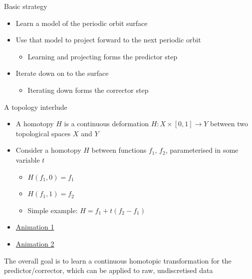 \documentclass[presentation]{beamer}
\begin{document}
\begin{frame}[label={sec:org2c4f0a5}]{Basic strategy}
\begin{itemize}
\item Learn a model of the periodic orbit surface
\item Use that model to project forward to the next periodic orbit
\begin{itemize}
\item Learning and projecting forms the predictor step
\end{itemize}
\item Iterate down on to the surface
\begin{itemize}
\item Iterating down forms the corrector step
\end{itemize}
\end{itemize}
\end{frame}

\begin{frame}[label={sec:orged14d88}]{A topology interlude}
\begin{itemize}
\item A homotopy \(H\) is a continuous deformation \(H:X \times [0,1] \to Y\) between two topological spaces \(X\) and \(Y\)
\item Consider a homotopy \(H\) between functions \(f_1\), \(f_2\), parameterised in some variable \(t\)
\begin{itemize}
\item \(H(f_1, 0) = f_1\)
\item \(H(f_1, 1) = f_2\)
\item Simple example: \(H = f_1 + t(f_2 - f_1)\)
\end{itemize}
\item \href{https://upload.wikimedia.org/wikipedia/commons/7/7e/HomotopySmall.gif}{Animation 1}
\item \href{https://en.wikipedia.org/wiki/Homotopy\#/media/File:Mug\_and\_Torus\_morph.gif}{Animation 2}
\end{itemize}

The overall goal is to learn a continuous homotopic transformation for the predictor/corrector, which can be applied to raw, undiscretised data
\end{frame}
\end{document}
